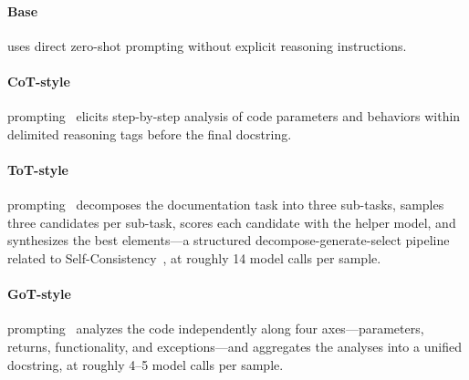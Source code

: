 \documentclass[pdflatex,sn-mathphys-ay]{sn-jnl}%
\theoremstyle{thmstyleone}%
\theoremstyle{thmstyletwo}%
\theoremstyle{thmstylethree}%
\begin{document}
\paragraph{Base} uses direct zero-shot prompting without explicit reasoning instructions.
\paragraph{CoT-style} prompting~\cite{cot} elicits step-by-step analysis of code parameters and behaviors within delimited reasoning tags before the final docstring.
\paragraph{ToT-style} prompting~\cite{tot} decomposes the documentation task into three sub-tasks, samples three candidates per sub-task, scores each candidate with the helper model, and synthesizes the best elements---a structured decompose-generate-select pipeline related to Self-Consistency~\cite{wang2023selfconsistency}, at roughly 14 model calls per sample.
\paragraph{GoT-style} prompting~\cite{got} analyzes the code independently along four axes---parameters, returns, functionality, and exceptions---and aggregates the analyses into a unified docstring, at roughly 4--5 model calls per sample.
\end{document}
